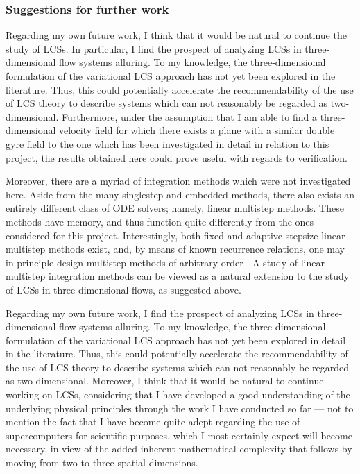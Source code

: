 \subsubsection{Suggestions for further work}

Regarding my own future work, I think that it would be natural to continue
the study of LCSs. In particular, I find the prospect of analyzing LCSs in
three-dimensional flow systems alluring. To my knowledge, the three-dimensional
formulation of the variational LCS approach has not yet been explored in the
literature. Thus, this could potentially accelerate the recommendability of
the use of LCS theory to describe systems which can not reasonably be regarded
as two-dimensional. Furthermore, under the assumption that I am able to
find a three-dimensional velocity field for which there exists a plane with a
similar double gyre field to the one which has been investigated in detail in
relation to this project, the results obtained here could prove useful
with regards to verification.

Moreover, there are a myriad of integration methods which were not investigated
here. Aside from the many singlestep and embedded methods, there also exists
an entirely different class of ODE solvers; namely, linear multistep methods.
These methods have memory, and thus function quite differently from the
ones considered for this project. Interestingly, both fixed and adaptive
stepsize linear multistep methods exist, and, by means of known recurrence
relations, one may in principle design multistep methods of arbitrary order
\parencite[chapter III]{hairer1993solving}. A study of linear multistep
integration methods can be viewed as a natural extension to the study of LCSs
in three-dimensional flows, as suggested above.





Regarding my own future work, I find the prospect of analyzing
LCSs in three-dimensional flow systems alluring. To my knowledge, the
three-dimensional formulation of the variational LCS approach has not yet
been explored in detail in the literature. Thus, this could potentially
accelerate the recommendability of the use of LCS theory to describe systems
which can not reasonably be regarded as two-dimensional. Moreover, I think
that it would be natural to continue working on LCSs, considering that I have
developed a good understanding of the underlying physical principles through the
work I have conducted so far --- not to mention the fact that I have become
quite adept regarding the use of supercomputers for scientific purposes, which
I most certainly expect will become necessary, in view of the added inherent
mathematical complexity that follows by moving from two to three spatial
dimensions.

